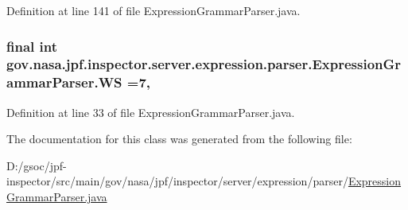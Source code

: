 Definition at line 141 of file Expression\+Grammar\+Parser.\+java.

\subsubsection[{\texorpdfstring{WS}{WS}}]{\setlength{\rightskip}{0pt plus 5cm}final int gov.\+nasa.\+jpf.\+inspector.\+server.\+expression.\+parser.\+Expression\+Grammar\+Parser.\+WS =7\hspace{0.3cm}{\ttfamily [static]}, {\ttfamily [package]}}\hypertarget{classgov_1_1nasa_1_1jpf_1_1inspector_1_1server_1_1expression_1_1parser_1_1_expression_grammar_parser_ace44714ae633c7b14794cc5a24d9ebf3}{}\label{classgov_1_1nasa_1_1jpf_1_1inspector_1_1server_1_1expression_1_1parser_1_1_expression_grammar_parser_ace44714ae633c7b14794cc5a24d9ebf3}


Definition at line 33 of file Expression\+Grammar\+Parser.\+java.



The documentation for this class was generated from the following file\+:\begin{DoxyCompactItemize}
\item 
D\+:/gsoc/jpf-\/inspector/src/main/gov/nasa/jpf/inspector/server/expression/parser/\hyperlink{_expression_grammar_parser_8java}{Expression\+Grammar\+Parser.\+java}\end{DoxyCompactItemize}
